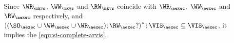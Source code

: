\begin{itemize}
Since \( \WR_\mkvs \), \( \WW_\mkvs \) and \( \RW_\mkvs \) coincide with
\( \WR_\aexec \), \( \WW_\aexec \) and \( \RW_\aexec \) respectively,
and \( \left( (\SO_{\aexec} \cup \WW_{\aexec} \cup \WR_{\aexec} ) ; \RW_{\aexec}? \right)^* ; \VIS_{\aexec}  \subseteq \VIS_\aexec \),
it implies the \cref{equ:si-complete-arvis}.

\end{itemize}
